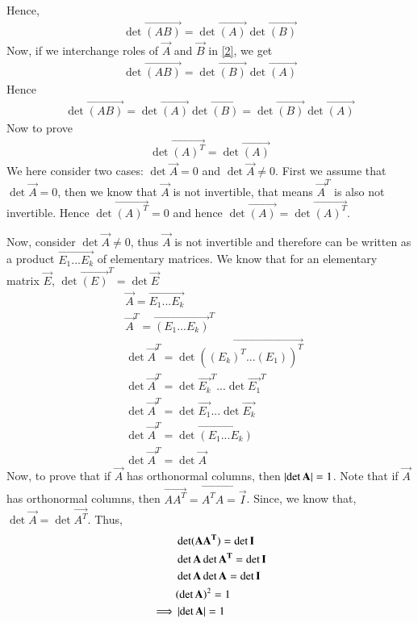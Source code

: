 \documentclass[journal,12pt,twocolumn]{IEEEtran}
\begin{document}
Hence,
\begin{align}
	\det\vec{(AB)}= \det\vec{(A)}\det\vec{(B)}
\end{align}
Now, if we interchange roles of $\vec{A}$ and $\vec{B}$ in \eqref{2}, we get
\begin{align}
	\det\vec{(AB)}= \det\vec{(B)}\det\vec{(A)}
\end{align}
Hence
\begin{align}
	\det\vec{(AB)}= \det\vec{(A)}\det\vec{(B)}= \det\vec{(B)}\det\vec{(A)} 
\end{align}
Now to prove
\begin{align}
\det\vec{(A)^T} = \det\vec{(A)}
\end{align}
We here consider two cases: $\det\vec{A}=0$ and $\det\vec{A}\not=0$. First we assume that $\det\vec{A}=0$, then we know that $\vec{A}$ is not invertible, that means $\vec{A}^T$ is also not invertible. Hence $\det\vec{(A)^T}=0$ and hence $\det\vec{(A)}= \det\vec{(A)^T}$.

Now, consider $\det\vec{A}\not=0$, thus $\vec{A}$ is not invertible and therefore can be written as a product $\vec{E_1...E_k}$ of elementary matrices. We know that for an elementary matrix $\vec{E}$, $\det\vec{(E)}^T= \det\vec{E}$
\begin{align}
& \vec{A} = \vec{E_1...E_k} \\
& \vec{A}^T = \vec{(E_1...E_k)}^T \\
& \det\vec{A}^T =\det \vec{((E_k)^T...(E_1))^T} \\
& \det\vec{A}^T =\det \vec{E_k}^T...\det\vec{E_1}^T \\
& \det\vec{A}^T =\det\vec{E_1}...\det\vec{E_k} \\
& \det\vec{A}^T =\det\vec{(E_1...E_k)} \\
& \det\vec{A}^T =\det\vec{A}
\end{align}
Now, to prove that if $\vec{A}$ has orthonormal columns, then $\left\vert\det\mathbf{A}\right\vert = 1$. Note that if $\vec{A}$ has orthonormal columns, then $\vec{AA^T}= \vec{A^TA= \vec{I}}$. Since, we know that, $\det\vec{A} = \det\vec{A^T}$. Thus,
\begin{align}
&\det(\mathbf{AA^T}) = \det\mathbf{I} \\
& \det\mathbf{A}\det\mathbf{A^T} = \det\mathbf{I} \\
& \det\mathbf{A}\det\mathbf{A} = \det\mathbf{I} \\
& (\det\mathbf{A})^2 = 1 \\
\implies& \left\vert\det\mathbf{A}\right\vert = 1
\end{align}
\end{document}
